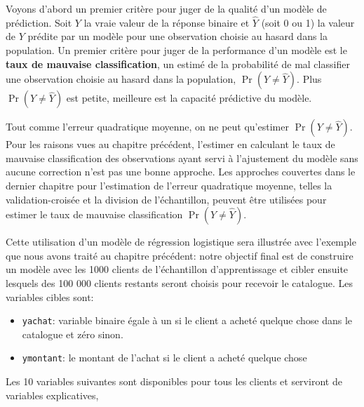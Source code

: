 \documentclass[
  11pt,
  letterpaper,
]{scrbook}
\providecommand{\tightlist}{%
  \setlength{\itemsep}{0pt}\setlength{\parskip}{0pt}}\usepackage{longtable,booktabs,array}
\theoremstyle{definition}
\theoremstyle{remark}
\begin{document}
Voyons d'abord un premier critère pour juger de la qualité d'un modèle
de prédiction. Soit \(Y\) la vraie valeur de la réponse binaire et
\(\widehat{Y}\) (soit 0 ou 1) la valeur de \(Y\) prédite par un modèle
pour une observation choisie au hasard dans la population. Un premier
critère pour juger de la performance d'un modèle est le \textbf{taux de
mauvaise classification}, un estimé de la probabilité de mal classifier
une observation choisie au hasard dans la population,
\(\Pr(Y \neq\widehat{Y})\). Plus \(\Pr(Y \neq\widehat{Y})\) est petite,
meilleure est la capacité prédictive du modèle.

Tout comme l'erreur quadratique moyenne, on ne peut qu'estimer
\(\Pr(Y \neq\widehat{Y})\). Pour les raisons vues au chapitre précédent,
l'estimer en calculant le taux de mauvaise classification des
observations ayant servi à l'ajustement du modèle sans aucune correction
n'est pas une bonne approche. Les approches couvertes dans le dernier
chapitre pour l'estimation de l'erreur quadratique moyenne, telles la
validation-croisée et la division de l'échantillon, peuvent être
utilisées pour estimer le taux de mauvaise classification
\(\Pr(Y \neq \widehat{Y})\).

Cette utilisation d'un modèle de régression logistique sera illustrée
avec l'exemple que nous avons traité au chapitre précédent: notre
objectif final est de construire un modèle avec les 1000 clients de
l'échantillon d'apprentissage et cibler ensuite lesquels des 100 000
clients restants seront choisis pour recevoir le catalogue. Les
variables cibles sont:

\begin{itemize}
\tightlist
\item
  \texttt{yachat}: variable binaire égale à un si le client a acheté
  quelque chose dans le catalogue et zéro sinon.
\item
  \texttt{ymontant}: le montant de l'achat si le client a acheté quelque
  chose
\end{itemize}

Les 10 variables suivantes sont disponibles pour tous les clients et
serviront de variables explicatives,
\end{document}
